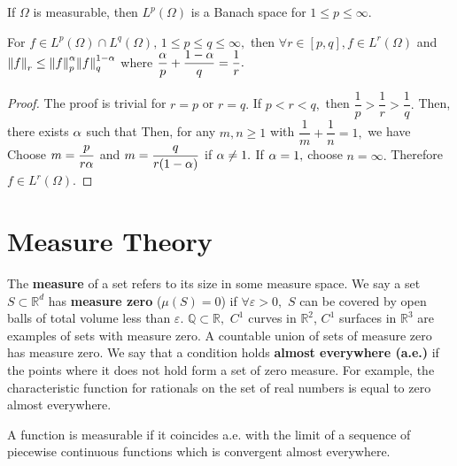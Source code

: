 \begin{theorem}
    If $\Omega$ is measurable, then $L^p(\Omega)$ is a Banach space for $1\leq p\leq\infty.$
\end{theorem}
\begin{theorem}
    For $f\in L^p(\Omega)\cap L^q(\Omega),\,1\leq p\leq q\leq \infty,$ then $\forall r\in[p,q],f\in L^r(\Omega)$ and $\norm{f}_r\leq\norm{f}_p^\alpha\norm{f}_q^{1-\alpha}$ where $\dfrac{\alpha}{p}+\dfrac{1-\alpha}{q}=\dfrac{1}{r}.$
\end{theorem}
\begin{proof}
    The proof is trivial for $r=p$ or $r=q.$ If $p<r<q,$ then $\dfrac{1}{p}>\dfrac{1}{r}>\dfrac{1}{q}.$ Then, there exists $\alpha$ such that
    Then, for any $m,n\geq1$ with $\dfrac{1}{m}+\dfrac{1}{n}=1,$ we have
    Choose $m=\dfrac{p}{r\alpha}$ and $m=\dfrac{q}{r(1-\alpha)}$ if $\alpha\neq1.$ If $\alpha=1,$ choose $n=\infty.$
    Therefore $f\in L^r(\Omega).$
\end{proof}

\section{Measure Theory}
The \textbf{measure} of a set refers to its size in some measure space. We say a set $S\subset\mathbb{R}^d$ has \textbf{measure zero} ($\mu(S)=0$) if $\forall\varepsilon>0,$ $S$ can be covered by open balls of total volume less than $\varepsilon.$ $\mathbb{Q}\subset\mathbb{R},$ $C^1$ curves in $\mathbb{R}^2$, $C^1$ surfaces in $\mathbb{R}^3$ are examples of sets with measure zero. A countable union of sets of measure zero has measure zero. We say that a condition holds \textbf{almost everywhere (a.e.)} if the points where it does not hold form a set of zero measure. For example, the characteristic function for rationals on the set of real numbers is equal to zero almost everywhere.

\begin{definition}
    A function is measurable if it coincides a.e. with the limit of a sequence of piecewise continuous functions which is convergent almost everywhere.
\end{definition}

